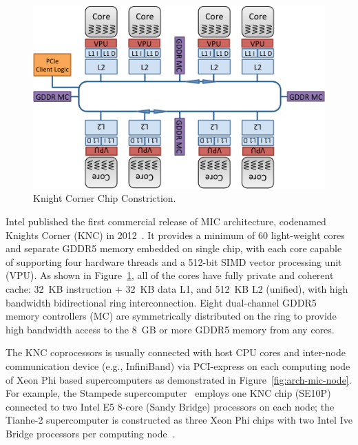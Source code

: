 \begin{figure}[ht]
\centering
\includegraphics[width=1\textwidth]{figures/background/arch-mic-knc.pdf}
\caption{Knight Corner Chip Constriction.}
\label{fig:arch-mic-knc}
\end{figure}

Intel published the first commercial release of MIC architecture, codenamed
Knights Corner (KNC) in 2012~\cite{knc,mic}. It provides a minimum of 60
light-weight cores and separate GDDR5 memory embedded on single chip,
with each core capable of supporting four hardware threads and a 512-bit
SIMD vector processing unit (VPU). As shown in Figure~\ref{fig:arch-mic-knc},
all of the cores have fully private and coherent cache: 32~KB instruction
+ 32~KB data L1, and 512~KB L2 (unified), with high bandwidth bidirectional
ring interconnection. Eight dual-channel GDDR5 memory controllers (MC)
are symmetrically distributed on the ring to provide high bandwidth access
to the 8~GB or more GDDR5 memory from any cores.

The KNC coprocessors is usually connected with host CPU cores and inter-node
communication device (e.g., InfiniBand) via PCI-express on each computing
node of Xeon Phi based supercomputers as demonstrated in
Figure~\ref{fig:arch-mic-node}. For example, the Stampede
supercomputer~\cite{stampede} employs one KNC chip (SE10P) connected to
two Intel E5 8-core (Sandy Bridge) processors on each node; the Tianhe-2
supercomputer is constructed as three Xeon Phi chips with two Intel
Ive Bridge processors per computing node~\cite{tianhe2}.

